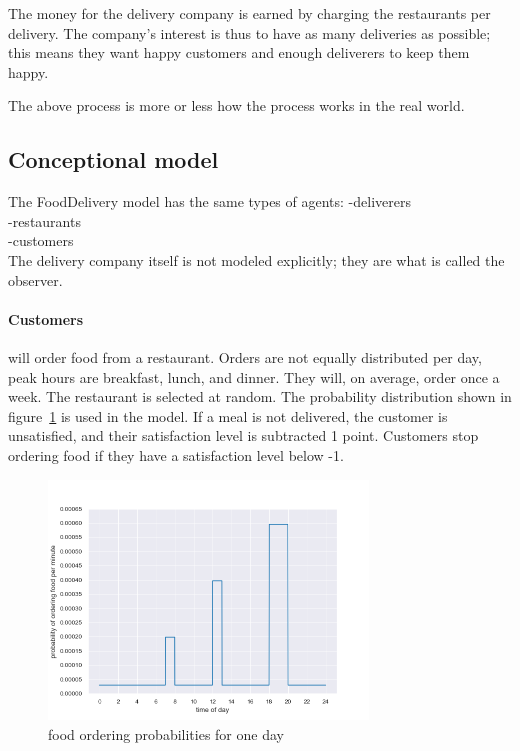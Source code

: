 The money for the delivery company is earned by charging the restaurants per delivery.
The company's interest is thus to have as many deliveries as possible; this means they want happy customers and enough deliverers to keep them happy.

The above process is more or less how the process works in the real world.

\subsection{Conceptional model}\label{subsec:conceptional-model}
The FoodDelivery model has the same types of agents:
-deliverers \\
-restaurants \\
-customers \\

The delivery company itself is not modeled explicitly; they are what is called the observer.

\paragraph{Customers} will order food from a restaurant.
Orders are not equally distributed per day, peak hours are breakfast, lunch, and dinner.
They will, on average, order once a week.
The restaurant is selected at random.
The probability distribution shown in figure~\ref{fig:food_ordering_distribution} is used in the model.
If a meal is not delivered, the customer is unsatisfied, and their satisfaction level is subtracted 1 point.
Customers stop ordering food if they have a satisfaction level below -1.

\begin{figure}
    \centering
    \includegraphics[width=8.5cm]{sections/pics/food_ordering_distribution}
    \caption{food ordering probabilities for one day}
    \label{fig:food_ordering_distribution}
\end{figure}

